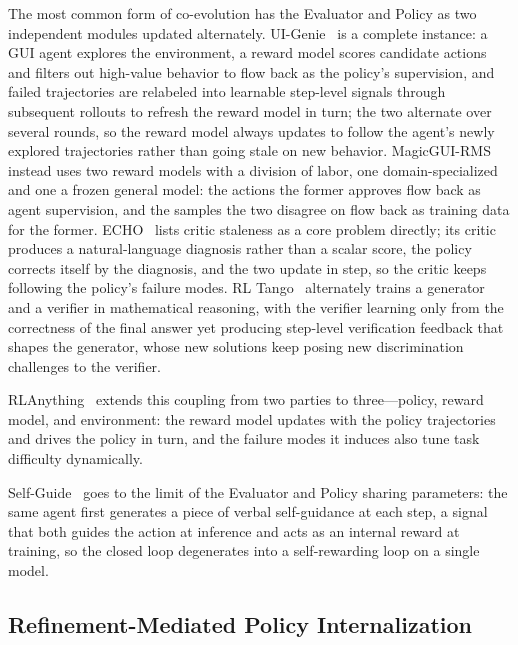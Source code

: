 The most common form of co-evolution has the Evaluator and Policy as two independent modules updated alternately. UI-Genie~\cite{Xia25e} is a complete instance: a GUI agent explores the environment, a reward model scores candidate actions and filters out high-value behavior to flow back as the policy's supervision, and failed trajectories are relabeled into learnable step-level signals through subsequent rollouts to refresh the reward model in turn; the two alternate over several rounds, so the reward model always updates to follow the agent's newly explored trajectories rather than going stale on new behavior. MagicGUI-RMS~\cite{Li26n} instead uses two reward models with a division of labor, one domain-specialized and one a frozen general model: the actions the former approves flow back as agent supervision, and the samples the two disagree on flow back as training data for the former. ECHO~\cite{Li26l} lists critic staleness as a core problem directly; its critic produces a natural-language diagnosis rather than a scalar score, the policy corrects itself by the diagnosis, and the two update in step, so the critic keeps following the policy's failure modes. RL Tango~\cite{Zha25y} alternately trains a generator and a verifier in mathematical reasoning, with the verifier learning only from the correctness of the final answer yet producing step-level verification feedback that shapes the generator, whose new solutions keep posing new discrimination challenges to the verifier.

RLAnything~\cite{Wan26u} extends this coupling from two parties to three---policy, reward model, and environment: the reward model updates with the policy trajectories and drives the policy in turn, and the failure modes it induces also tune task difficulty dynamically.

Self-Guide~\cite{Wan26aj} goes to the limit of the Evaluator and Policy sharing parameters: the same agent first generates a piece of verbal self-guidance at each step, a signal that both guides the action at inference and acts as an internal reward at training, so the closed loop degenerates into a self-rewarding loop on a single model.

\subsection{Refinement-Mediated Policy Internalization}
\label{sec:refinement-mediated}

